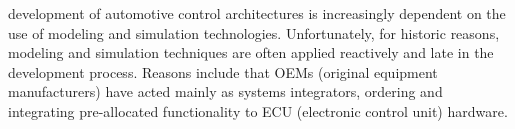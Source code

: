 
% 
% 
% 
% 

 development of automotive control architectures is increasingly dependent on the use of modeling and simulation technologies.
Unfortunately, for historic reasons, modeling and simulation techniques are often applied reactively and late in the development process.
Reasons include that OEMs (original equipment manufacturers) have acted mainly as systems integrators, ordering and integrating pre-allocated functionality to ECU (electronic control unit) hardware.
